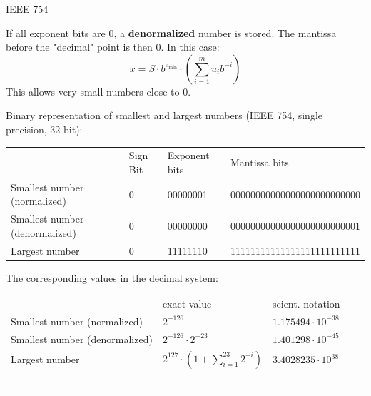 \documentclass[11pt,compress,t,notes=noshow, xcolor=table]{beamer}
\begin{document}
\begin{vbframe}{IEEE 754}
\lz

If all exponent bits are $0$, a \textbf{denormalized} number is stored. The mantissa before the "decimal" point is then $0$. In this case:
$$
x = S \cdot b^{e_{\min}} \cdot \left(\sum_{i=1}^m u_{i} b^{-i}\right) %
$$
This allows very small numbers close to 0.

\framebreak
Binary representation of smallest and largest numbers (IEEE 754, single precision, 32 bit):
\begin{scriptsize}
\begin{table}
    \begin{tabular}{llll}
    ~ & Sign Bit & Exponent bits & Mantissa bits \\
    Smallest number (normalized) & 0 & 00000001 & 00000000000000000000000000 \\
    Smallest number (denormalized) & 0 & 00000000 & 00000000000000000000000001 \\
    Largest number & 0 & 11111110 & 11111111111111111111111111 \\
    \end{tabular}
\end{table}
\end{scriptsize}

The corresponding values in the decimal system:

\begin{footnotesize}
\begin{table}
    \begin{tabular}{lll}
    ~ & exact value & scient. notation\\
     Smallest number (normalized) & $2^{-126}$ & $1.175494 \cdot 10^{-38}$ \\
    Smallest number (denormalized) & $2^{-126} \cdot 2^{-23}$ & $1.401298 \cdot 10^{-45}$ \\
     Largest number & $2^{127} \cdot (1+\sum_{i=1}^{23} 2^{-i})$ & $3.4028235 \cdot 10^{38}$\\\
    \end{tabular}
\end{table}
\end{footnotesize}

\framebreak








\end{vbframe}
\end{document}
